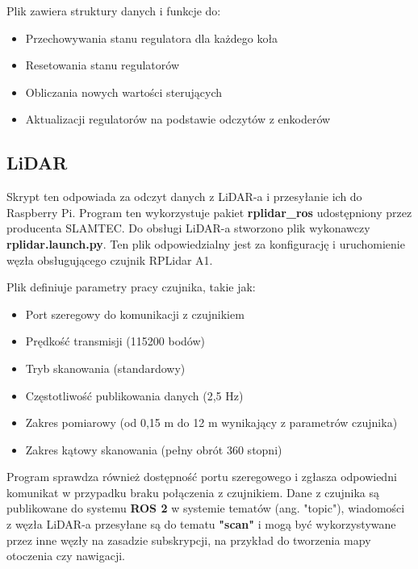 \documentclass[a4paper,twoside,12pt]{book}
\begin{document}
\begin{itemize}
			Plik zawiera struktury danych i funkcje do:
			\begin{itemize}
				\item Przechowywania stanu regulatora dla każdego koła
				\item Resetowania stanu regulatorów
				\item Obliczania nowych wartości sterujących
				\item Aktualizacji regulatorów na podstawie odczytów z enkoderów
			\end{itemize}
			
\end{itemize}
 
\newpage
\subsection{LiDAR}
Skrypt ten odpowiada za odczyt danych z LiDAR-a i przesyłanie ich do Raspberry Pi. Program ten wykorzystuje pakiet  \textbf{rplidar\_ros} udostępniony przez producenta SLAMTEC. 
Do obsługi LiDAR-a stworzono plik wykonawczy  \textbf{rplidar.launch.py}. Ten plik odpowiedzialny jest za konfigurację i uruchomienie węzła obsługującego czujnik RPLidar A1. 


Plik definiuje parametry pracy czujnika, takie jak:
\begin{itemize}
\item Port szeregowy do komunikacji z czujnikiem
\item Prędkość transmisji (115200 bodów)
\item Tryb skanowania (standardowy)
\item Częstotliwość publikowania danych (2,5 Hz)
\item Zakres pomiarowy (od 0,15 m do 12 m wynikający z parametrów czujnika)
\item Zakres kątowy skanowania (pełny obrót 360 stopni)
\end{itemize}

Program sprawdza również dostępność portu szeregowego i zgłasza odpowiedni komunikat w przypadku braku połączenia z czujnikiem. Dane z czujnika są publikowane do systemu \textbf{ROS 2} w systemie tematów (ang. "topic"), wiadomości z węzła LiDAR-a przesyłane są do tematu  \textbf{"scan"} i mogą być wykorzystywane przez inne węzły na zasadzie subskrypcji, na przykład do tworzenia mapy otoczenia czy nawigacji.
\end{document}
